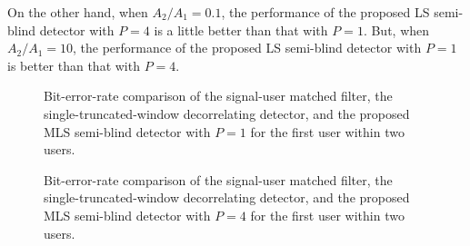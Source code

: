 \documentclass[a4paper,10pt,fleqn, twocolumn]{IEEETran}
\begin{document}
On the other hand, when $A_2/A_1=0.1$, the performance of the
proposed LS semi-blind detector with $P=4$ is a little better than
that with $P=1$. But, when $A_2/A_1=10$, the performance of the
proposed LS semi-blind detector with $P=1$ is better than that
with $P=4$.

\begin{figure}
\caption{Bit-error-rate comparison of the signal-user matched
filter, the single-truncated-window decorrelating detector, and
the proposed MLS semi-blind detector with $P=1$ for the first user
within two users.} \label{MLS11}
\end{figure}


\begin{figure}
\caption{Bit-error-rate comparison of the signal-user matched
filter, the single-truncated-window decorrelating detector, and
the proposed MLS semi-blind detector with $P=4$ for the first user
within two users.} \label{MLS41}
\end{figure}
\end{document}

